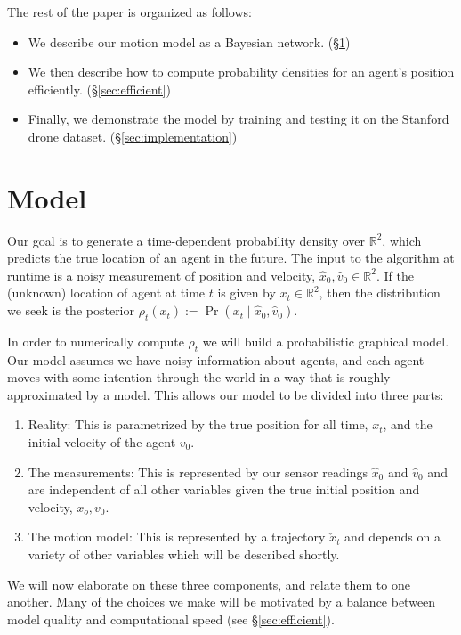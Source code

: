 \documentclass[conference]{IEEEtran}
\begin{document}
The rest of the paper is organized as follows:
\begin{itemize}
	\item We describe our motion model as a Bayesian network. (\S \ref{sec:model})
	\item We then describe how to compute probability densities for an agent's position efficiently. (\S \ref{sec:efficient})
	\item Finally, we demonstrate the model by training and testing it on the Stanford drone dataset. (\S \ref{sec:implementation})
\end{itemize}

\section{Model}\label{sec:model}
Our goal is to generate a time-dependent probability density over $\mathbb{R}^2$, which predicts the true location of an agent in the future.
The input to the algorithm at runtime is a noisy measurement of position and velocity, $\hat{x}_0, \hat{v}_0 \in \mathbb{R}^2$.
If the (unknown) location of agent at time $t$ is given by $x_t \in \mathbb{R}^2$, then the distribution we seek is the posterior $\rho_t(x_t) := \Pr( x_t \mid \hat{x}_0, \hat{v}_0 )$.

In order to numerically compute $\rho_t$ we will build a probabilistic graphical model.
Our model assumes we have noisy information about agents, and each agent moves with some intention through the world in a way that is roughly approximated by a model.
This allows our model to be divided into three parts:
\begin{enumerate}
	\item Reality:  This is parametrized by the true position for all time, $x_t$, and the initial velocity of the agent $v_0$.
	\item The measurements:  This is represented by our sensor readings $\hat{x}_0$ and $\hat{v}_0$ and are independent of all other variables given the true initial position and velocity, $x_o, v_0$.
	\item The motion model:  This is represented by a trajectory $\check{x}_t$ and depends on a variety of other variables which will be described shortly.
\end{enumerate}
We will now elaborate on these three components, and relate them to one another.
Many of the choices we make will be motivated by a balance between model quality and computational speed (see \S \ref{sec:efficient}).
\end{document}
